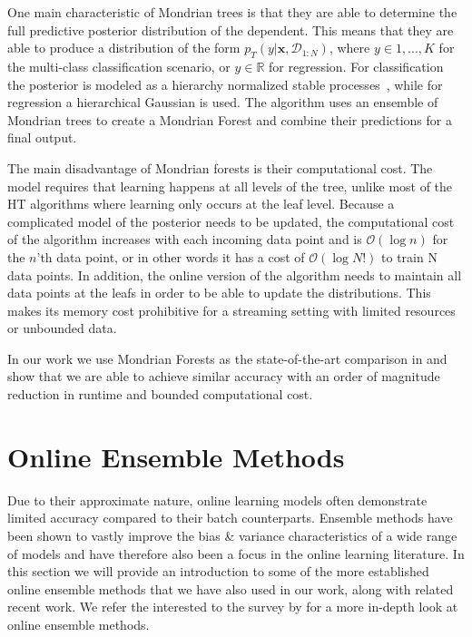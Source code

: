 One main characteristic of Mondrian trees is that they are able to determine the full
predictive posterior distribution of the dependent. This means that they are able to
produce a distribution of the form $p_T(y |\mathbf{x}, \mathcal{D}_{1:N})$, where
$y \in {1,..., K}$ for the multi-class classification scenario, or $y \in \mathbb{R}$
for regression. For classification the posterior is modeled as a hierarchy
normalized stable processes~\cite{nsp}, while for regression a hierarchical Gaussian is used.
The algorithm uses an ensemble of Mondrian trees to create a Mondrian Forest and combine
their predictions for a final output.

The main disadvantage of Mondrian forests is their computational cost. The model
requires that learning happens at all levels of the tree, unlike most of the HT
algorithms where learning only occurs at the leaf level. Because a complicated
model of the posterior needs to be updated, the computational cost of the algorithm
increases with each incoming data point and is $\mathcal{O}(\log n)$ for the $n$'th
data point, or in other words it has a cost of $\mathcal{O}(\log N!)$ to train N
data points. In addition, the online version of the algorithm needs to maintain
all data points at the leafs in order to be able to update the distributions.
This makes its memory cost prohibitive for a streaming setting with limited resources
or unbounded data.

In our work we use Mondrian Forests as the state-of-the-art comparison in \uncertaintrees
and show that we are able to achieve similar accuracy with an order of magnitude reduction
in runtime and bounded computational cost.


\section{Online Ensemble Methods}
\label{sec:bg-ol-ensembles}

Due to their approximate nature, online learning models often demonstrate
limited accuracy compared to their batch counterparts. Ensemble methods
have been shown to vastly improve the bias \& variance characteristics
of a wide range of models \cite{ensemble-methods-dietrich} and have therefore
also been a focus in the online learning literature.
In this section we will provide an introduction to some of the more established
online ensemble methods that we have also used in our work, along with related
recent work. We refer the interested to the survey by \citet{online-ensembles-survey}
for a more in-depth look at online ensemble methods.

